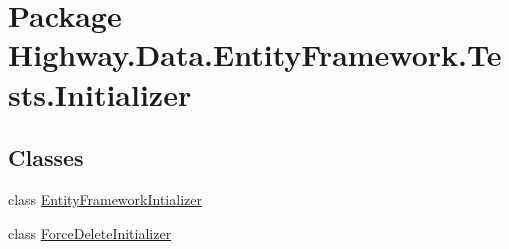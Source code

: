 \hypertarget{namespace_highway_1_1_data_1_1_entity_framework_1_1_tests_1_1_initializer}{\section{Package Highway.\-Data.\-Entity\-Framework.\-Tests.\-Initializer}
\label{namespace_highway_1_1_data_1_1_entity_framework_1_1_tests_1_1_initializer}
}
\subsection*{Classes}
\begin{DoxyCompactItemize}
\item 
class \hyperlink{class_highway_1_1_data_1_1_entity_framework_1_1_tests_1_1_initializer_1_1_entity_framework_intializer}{Entity\-Framework\-Intializer}
\item 
class \hyperlink{class_highway_1_1_data_1_1_entity_framework_1_1_tests_1_1_initializer_1_1_force_delete_initializer}{Force\-Delete\-Initializer}
\end{DoxyCompactItemize}
